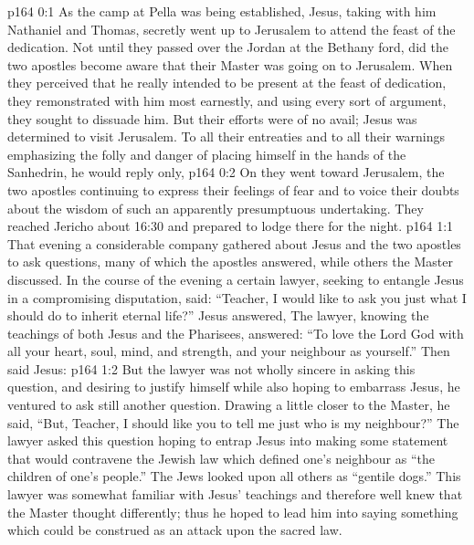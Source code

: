\author{Midwayer Commission}
\vs p164 0:1 As the camp at Pella was being established, Jesus, taking with him Nathaniel and Thomas, secretly went up to Jerusalem to attend the feast of the dedication. Not until they passed over the Jordan at the Bethany ford, did the two apostles become aware that their Master was going on to Jerusalem. When they perceived that he really intended to be present at the feast of dedication, they remonstrated with him most earnestly, and using every sort of argument, they sought to dissuade him. But their efforts were of no avail; Jesus was determined to visit Jerusalem. To all their entreaties and to all their warnings emphasizing the folly and danger of placing himself in the hands of the Sanhedrin, he would reply only, 
\vs p164 0:2 On they went toward Jerusalem, the two apostles continuing to express their feelings of fear and to voice their doubts about the wisdom of such an apparently presumptuous undertaking. They reached Jericho about 16:30 and prepared to lodge there for the night.
\vs p164 1:1 That evening a considerable company gathered about Jesus and the two apostles to ask questions, many of which the apostles answered, while others the Master discussed. In the course of the evening a certain lawyer, seeking to entangle Jesus in a compromising disputation, said: “Teacher, I would like to ask you just what I should do to inherit eternal life?” Jesus answered,  The lawyer, knowing the teachings of both Jesus and the Pharisees, answered: “To love the Lord God with all your heart, soul, mind, and strength, and your neighbour as yourself.” Then said Jesus: 
\vs p164 1:2 But the lawyer was not wholly sincere in asking this question, and desiring to justify himself while also hoping to embarrass Jesus, he ventured to ask still another question. Drawing a little closer to the Master, he said, “But, Teacher, I should like you to tell me just who is my neighbour?” The lawyer asked this question hoping to entrap Jesus into making some statement that would contravene the Jewish law which defined one’s neighbour as “the children of one’s people.” The Jews looked upon all others as “gentile dogs.” This lawyer was somewhat familiar with Jesus’ teachings and therefore well knew that the Master thought differently; thus he hoped to lead him into saying something which could be construed as an attack upon the sacred law.
